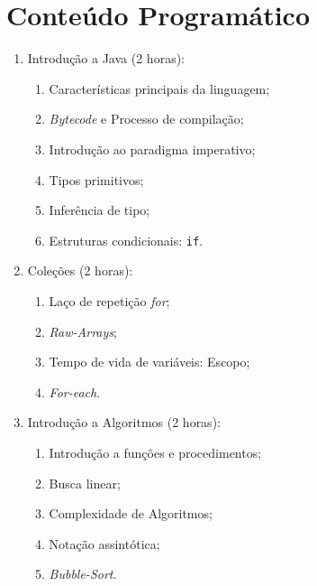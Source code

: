 \documentclass{article}
\begin{document}
\section{Conteúdo Programático}

\begin{enumerate}
    \item Introdução a Java (2 horas):
        \begin{samepage}
        \begin{enumerate}
                \item Características principais da linguagem;
                \item \textit{Bytecode} e Processo de compilação;
                \item Introdução ao paradigma imperativo;
                \item Tipos primitivos;
                \item Inferência de tipo;
                \item Estruturas condicionais: \texttt{if}.
        \end{enumerate}
        \end{samepage}
    \item Coleções (2 horas):
        \begin{samepage}
        \begin{enumerate}
                \item Laço de repetição \textit{for};
                \item \textit{Raw-Arrays};
                \item Tempo de vida de variáveis: Escopo;
                \item \textit{For-each}.
        \end{enumerate}
        \end{samepage}
    \item Introdução a Algoritmos (2 horas):
        \begin{samepage}
        \begin{enumerate}
                \item Introdução a funções e procedimentos;
                \item Busca linear;
                \item Complexidade de Algoritmos;
                \item Notação assintótica;
                \item \textit{Bubble-Sort}.
        \end{enumerate}
        \end{samepage}

\end{enumerate}
\end{document}
